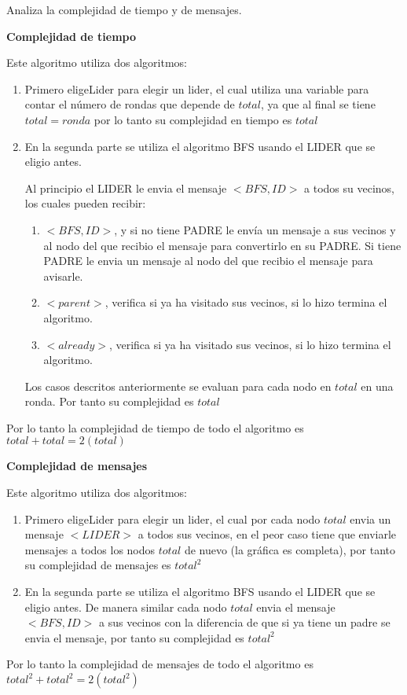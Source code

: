 Analiza la complejidad de tiempo y de mensajes.

\textbf{Complejidad de tiempo}

Este algoritmo utiliza dos algoritmos:
\begin{enumerate}
    \item Primero eligeLider para elegir un lider, el cual utiliza una variable para contar el número de rondas que depende de $total$, ya que al final se tiene $total=ronda$ por lo tanto su complejidad en tiempo es $total$ 

    \item En la segunda parte se utiliza el algoritmo BFS usando el LIDER que se eligio antes. 

    Al principio el LIDER le envia el mensaje $<BFS,ID>$ a todos su vecinos, los cuales pueden recibir:
    \begin{enumerate}
        \item $<BFS,ID>$, y si no tiene PADRE le envía un mensaje a sus vecinos y al nodo del que recibio el mensaje para convertirlo en su PADRE. Si tiene PADRE le envia un mensaje al nodo del que recibio el mensaje para avisarle.
        \item $<parent>$, verifica si ya ha visitado sus vecinos, si lo hizo termina el algoritmo.
        \item $<already>$, verifica si ya ha visitado sus vecinos, si lo hizo termina el algoritmo.
    \end{enumerate}
    Los casos descritos anteriormente se evaluan para cada nodo en $total$ en una ronda. Por tanto su complejidad es $total$
\end{enumerate} 

Por lo tanto la complejidad de tiempo de todo el algoritmo es $total+total= 2(total)$


\textbf{Complejidad de mensajes}

Este algoritmo utiliza dos algoritmos:
\begin{enumerate}
    \item Primero eligeLider para elegir un lider, el cual por cada nodo $total$ envia un mensaje $<LIDER>$ a todos sus vecinos, en el peor caso tiene que enviarle mensajes a todos los nodos $total$ de nuevo (la gráfica es completa), por tanto su complejidad de mensajes es $total^2$ 
    \item En la segunda parte se utiliza el algoritmo BFS usando el LIDER que se eligio antes. De manera similar cada nodo $total$ envia el mensaje $<BFS,ID>$ a sus vecinos con la diferencia de que si ya tiene un padre se envia el mensaje, por tanto su complejidad es $total^2$
\end{enumerate}

Por lo tanto la complejidad de mensajes de todo el algoritmo es $total^2+total^2= 2(total^2)$
